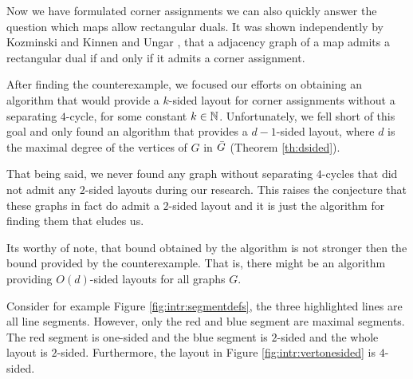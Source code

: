   Now we have formulated corner assignments we can also quickly answer the question which maps allow rectangular duals. It was shown independently by Kozminski and Kinnen \cite{Kozminski1984} and Ungar \cite{Ungar1953}, that a adjacency graph of a map admits a rectangular dual if and only if it admits a corner assignment.

  After finding the counterexample, we focused our efforts on obtaining an algorithm that would provide a $k$-sided layout for corner assignments without a separating $4$-cycle, for some constant $k \in \mathbb{N}$.
  Unfortunately, we fell short of this goal and only found an algorithm that provides a $d-1$-sided layout, where $d$ is the maximal degree of the vertices of $G$ in $\bar{G}$ (Theorem \ref{th:dsided}).

  That being said, we never found any graph without separating $4$-cycles that did not admit any $2$-sided layouts during our research.
  This raises the conjecture that these graphs in fact do admit a $2$-sided layout and it is just the algorithm for finding them that eludes us.

  Its worthy of note, that bound obtained by the algorithm is not stronger then the bound provided by the counterexample. That is, there might be an algorithm providing $O(d)$-sided layouts for all graphs $G$.

  Consider for example Figure \ref{fig:intr:segmentdefs}, the three highlighted lines are all line segments. However, only the red and blue segment are maximal segments. The red segment is one-sided and the blue segment is $2$-sided and the whole layout is $2$-sided. Furthermore, the layout in Figure \ref{fig:intr:vertonesided} is $4$-sided.

